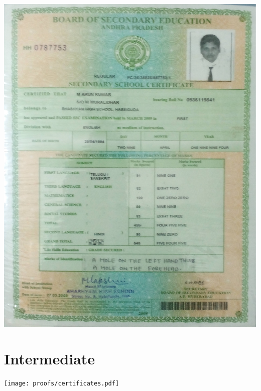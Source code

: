 \documentclass{article}
\begin{document}
	\includegraphics[page=1, scale=0.2]{proofs/ssc_memo.jpg}
\section{Intermediate}
	\texttt{[image: proofs/certificates.pdf]}\\
\end{document}
